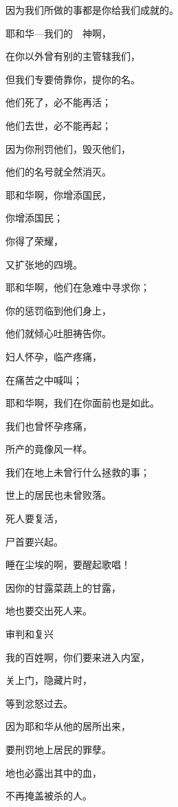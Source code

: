 {\par }{\Q 因为我们所做的事都是你给我们成就的。
\par }{\Q {}耶和华—我们的　神啊，
\par }{\Q 在你以外曾有别的主管辖我们，
\par }{\Q 但我们专要倚靠你，提你的名。
\par }{\Q {}他们死了，必不能再活；
\par }{\Q 他们去世，必不能再起；
\par }{\Q 因为你刑罚他们，毁灭他们，
\par }{\Q 他们的名号就全然消灭。
\par }{\Q {}耶和华啊，你增添国民，
\par }{\Q 你增添国民；
\par }{\Q 你得了荣耀，
\par }{\Q 又扩张地的四境。
\par }{\BB \par }{\Q {}耶和华啊，他们在急难中寻求你；
\par }{\Q 你的惩罚临到他们身上，
\par }{\Q 他们就倾心吐胆祷告你。
\par }{\Q {}妇人怀孕，临产疼痛，
\par }{\Q 在痛苦之中喊叫；
\par }{\Q 耶和华啊，我们在你面前也是如此。
\par }{\Q {}我们也曾怀孕疼痛，
\par }{\Q 所产的竟像风一样。
\par }{\Q 我们在地上未曾行什么拯救的事；
\par }{\Q 世上的居民也未曾败落。
\par }{\Q {}死人要复活，
\par }{\Q 尸首要兴起。
\par }{\Q 睡在尘埃的啊，要醒起歌唱！
\par }{\Q 因你的甘露{}菜蔬上的甘露，
\par }{\Q 地也要交出死人来。
\par }{\SH 审判和复兴
\par }{\Q {}我的百姓啊，你们要来进入内室，
\par }{\Q 关上门，隐藏片时，
\par }{\Q 等到忿怒过去。
\par }{\Q {}因为耶和华从他的居所出来，
\par }{\Q 要刑罚地上居民的罪孽。
\par }{\Q 地也必露出其中的血，
\par }{\Q 不再掩盖被杀的人。

}
